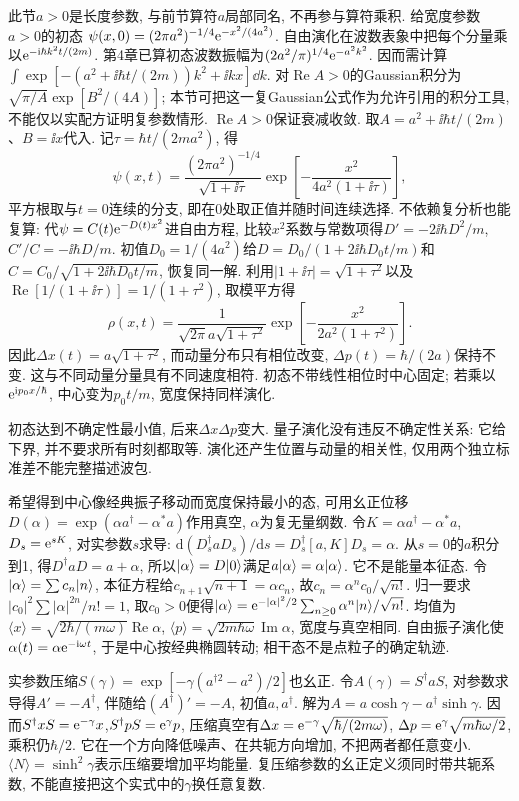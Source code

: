 此节$a>0$是长度参数, 与前节算符$a$局部同名, 不再参与算符乘积. 给宽度参数$a>0$的初态 $\psi(x,0)=(2\pi a^2)^{-1/4}\mathrm e^{-x^2/(4a^2)}$. 自由演化在波数表象中把每个分量乘以$\mathrm e^{-\mathrm i\hbar k^2t/(2m)}$. 第4章已算初态波数振幅为$(2a^2/\pi)^{1/4}\mathrm e^{-a^2k^2}$. 因而需计算$\int\exp[-(a^2+\ii\hbar t/(2m))k^2+\ii kx]\dd k$. 对$\operatorname{Re}A>0$的Gaussian积分为$\sqrt{\pi/A}\exp[B^2/(4A)]$; 本节可把这一复Gaussian公式作为允许引用的积分工具, 不能仅以实配方证明复参数情形. $\operatorname{Re}A>0$保证衰减收敛. 取$A=a^2+\ii\hbar t/(2m)$、$B=\ii x$代入. 记$\tau=\hbar t/(2ma^2)$, 得
\[
\psi(x,t)=\frac{(2\pi a^2)^{-1/4}}{\sqrt{1+\ii\tau}}
\exp\left[-\frac{x^2}{4a^2(1+\ii\tau)}\right],
\]
平方根取与$t=0$连续的分支, 即在0处取正值并随时间连续选择. 不依赖复分析也能复算: 代$\psi=C(t)\mathrm e^{-D(t)x^2}$进自由方程, 比较$x^2$系数与常数项得$D\prime=-2\ii\hbar D^2/m$,$C\prime/C=-\ii\hbar D/m$. 初值$D_0=1/(4a^2)$给$D=D_0/(1+2\ii\hbar D_0t/m)$和$C=C_0/\sqrt{1+2\ii\hbar D_0t/m}$, 恢复同一解. 利用$|1+\ii\tau|=\sqrt{1+\tau^2}$以及$\operatorname{Re}[1/(1+\ii\tau)]=1/(1+\tau^2)$, 取模平方得
\[
\rho(x,t)=\frac1{\sqrt{2\pi}a\sqrt{1+\tau^2}}
\exp\left[-\frac{x^2}{2a^2(1+\tau^2)}\right].
\]
因此$\Delta x(t)=a\sqrt{1+\tau^2}$, 而动量分布只有相位改变, $\Delta p(t)=\hbar/(2a)$保持不变. 这与不同动量分量具有不同速度相符. 初态不带线性相位时中心固定; 若乘以$\mathrm e^{\mathrm i p_0x/\hbar}$, 中心变为$p_0t/m$, 宽度保持同样演化.

初态达到不确定性最小值, 后来$\Delta x\Delta p$变大. 量子演化没有违反不确定性关系: 它给下界, 并不要求所有时刻都取等. 演化还产生位置与动量的相关性, 仅用两个独立标准差不能完整描述波包.

希望得到中心像经典振子移动而宽度保持最小的态, 可用幺正位移$D(\alpha)=\exp(\alpha a^\dagger-\alpha^*a)$作用真空, $\alpha$为复无量纲数. 令$K=\alpha a^\dagger-\alpha^*a$, $D_s=\mathrm e^{sK}$, 对实参数$s$求导: $\mathrm d(D_s^\dagger aD_s)/\mathrm ds=D_s^\dagger[a,K]D_s=\alpha$. 从$s=0$的$a$积分到1, 得$D^\dagger aD=a+\alpha$, 所以$\lvert \alpha\rangle=D\lvert 0\rangle$满足$a\lvert \alpha\rangle=\alpha\lvert \alpha\rangle$. 它不是能量本征态. 令$\lvert \alpha\rangle=\sum c_n\lvert n\rangle$, 本征方程给$c_{n+1}\sqrt{n+1}=\alpha c_n$, 故$c_n=\alpha^nc_0/\sqrt{n!}$. 归一要求$|c_0|^2\sum|\alpha|^{2n}/n!=1$, 取$c_0>0$便得$\lvert \alpha\rangle=\mathrm e^{-|\alpha|^2/2}\sum_{n\geq0}\alpha^n\lvert n\rangle/\sqrt{n!}$. 均值为$\langle x\rangle=\sqrt{2\hbar/(m\omega)}\operatorname{Re}\alpha$, $\langle p\rangle=\sqrt{2m\hbar\omega}\operatorname{Im}\alpha$, 宽度与真空相同. 自由振子演化使$\alpha(t)=\alpha\mathrm e^{-\mathrm i\omega t}$, 于是中心按经典椭圆转动; 相干态不是点粒子的确定轨迹.

实参数压缩$S(\gamma)=\exp[-\gamma(a^{\dagger2}-a^2)/2]$也幺正. 令$A(\gamma)=S^\dagger aS$, 对参数求导得$A'=-A^\dagger$, 伴随给$(A^\dagger)'=-A$, 初值$a,a^\dagger$. 解为$A=a\cosh\gamma-a^\dagger\sinh\gamma$. 因而$S^\dagger xS=\mathrm e^{-\gamma}x$,$S^\dagger pS=\mathrm e^\gamma p$, 压缩真空有$\Delta x=\mathrm e^{-\gamma}\sqrt{\hbar/(2m\omega)}$, $\Delta p=\mathrm e^\gamma\sqrt{m\hbar\omega/2}$, 乘积仍$\hbar/2$. 它在一个方向降低噪声、在共轭方向增加, 不把两者都任意变小. $\langle N\rangle=\sinh^2\gamma$表示压缩要增加平均能量. 复压缩参数的幺正定义须同时带共轭系数, 不能直接把这个实式中的$\gamma$换任意复数.
